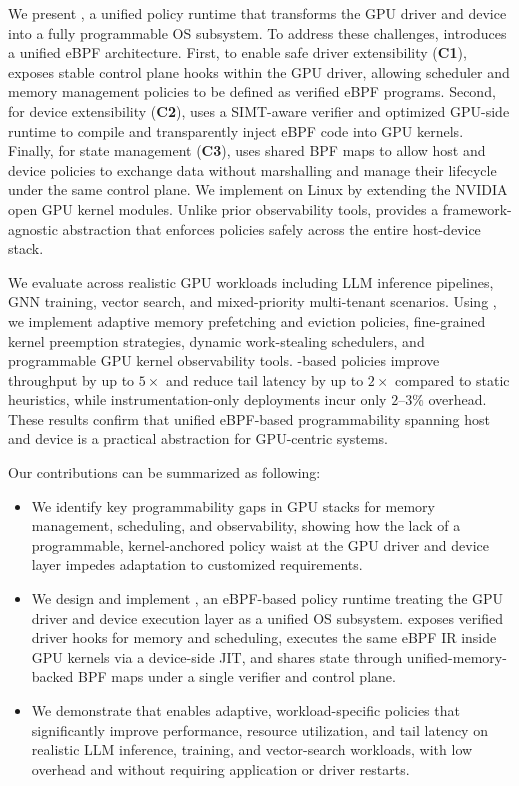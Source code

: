 We present \sys, a unified policy runtime that transforms the GPU driver and device into a fully programmable OS subsystem. To address these challenges, \sys introduces a unified eBPF architecture. First, to enable safe driver extensibility (\textbf{C1}), \sys exposes stable control plane hooks within the GPU driver, allowing scheduler and memory management policies to be defined as verified eBPF programs. Second, for device extensibility (\textbf{C2}), \sys uses a SIMT-aware verifier and optimized GPU-side runtime to compile and transparently inject eBPF code into GPU kernels. Finally, for state management (\textbf{C3}), \sys uses shared BPF maps to allow host and device policies to exchange data without marshalling and manage their lifecycle under the same control plane. We implement \sys on Linux by extending the NVIDIA open GPU kernel modules\cite{nvidia-open-gpu}. Unlike prior observability tools\cite{cupti,villa2019nvbit,neutrino,egpu}, \sys provides a framework-agnostic abstraction that enforces policies safely across the entire host-device stack.

We evaluate \sys across realistic GPU workloads including LLM inference pipelines, GNN training, vector search, and mixed-priority multi-tenant scenarios. Using \sys, we implement adaptive memory prefetching and eviction policies, fine-grained kernel preemption strategies, dynamic work-stealing schedulers, and programmable GPU kernel observability tools. \sys-based policies improve throughput by up to $5\times$ and reduce tail latency by up to $2\times$ compared to static heuristics, while instrumentation-only deployments incur only $2$--$3\%$ overhead. These results confirm that unified eBPF-based programmability spanning host and device is a practical abstraction for GPU-centric systems.

Our contributions can be summarized as following:

\begin{itemize}[leftmargin=*,itemsep=0pt]
  \item We identify key programmability gaps in GPU stacks for memory management, scheduling, and observability, showing how the lack of a programmable, kernel-anchored policy waist at the GPU driver and device layer impedes adaptation to customized requirements. %
  \item We design and implement \sys, an eBPF-based policy runtime treating the GPU driver and device execution layer as a unified OS subsystem. \sys exposes verified driver hooks for memory and scheduling, executes the same eBPF IR inside GPU kernels via a device-side JIT, and shares state through unified-memory-backed BPF maps under a single verifier and control plane.
  \item We demonstrate that \sys enables adaptive, workload-specific policies that significantly improve performance, resource utilization, and tail latency on realistic LLM inference, training, and vector-search workloads, with low overhead and without requiring application or driver restarts.
\end{itemize}